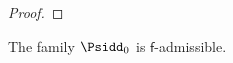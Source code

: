 \begin{proof}
%
\end{proof}

\begin{proposition} \label{prop:psidd-zero-admissible}
  The family $\Psidd_0$ is $\mathsf{f}$-admissible.
\end{proposition}

